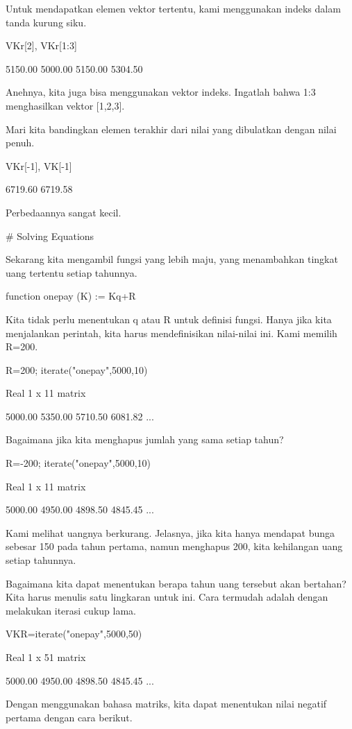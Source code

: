 \documentclass{article}
\begin{document}
Untuk mendapatkan elemen vektor tertentu, kami menggunakan indeks
dalam tanda kurung siku.


\>VKr[2], VKr[1:3]


        5150.00 
        5000.00     5150.00     5304.50 

Anehnya, kita juga bisa menggunakan vektor indeks. Ingatlah bahwa 1:3
menghasilkan vektor [1,2,3].


Mari kita bandingkan elemen terakhir dari nilai yang dibulatkan dengan
nilai penuh.


\>VKr[-1], VK[-1]


        6719.60 
        6719.58 

Perbedaannya sangat kecil.


# Solving Equations

Sekarang kita mengambil fungsi yang lebih maju, yang menambahkan
tingkat uang tertentu setiap tahunnya.


\>function onepay (K) := K\*q+R


Kita tidak perlu menentukan q atau R untuk definisi fungsi. Hanya jika
kita menjalankan perintah, kita harus mendefinisikan nilai-nilai ini.
Kami memilih R=200.


\>R=200; iterate("onepay",5000,10)


    Real 1 x 11 matrix
    
        5000.00     5350.00     5710.50     6081.82     ...

Bagaimana jika kita menghapus jumlah yang sama setiap tahun?


\>R=-200; iterate("onepay",5000,10)


    Real 1 x 11 matrix
    
        5000.00     4950.00     4898.50     4845.45     ...

Kami melihat uangnya berkurang. Jelasnya, jika kita hanya mendapat
bunga sebesar 150 pada tahun pertama, namun menghapus 200, kita
kehilangan uang setiap tahunnya.


Bagaimana kita dapat menentukan berapa tahun uang tersebut akan
bertahan? Kita harus menulis satu lingkaran untuk ini. Cara termudah
adalah dengan melakukan iterasi cukup lama.


\>VKR=iterate("onepay",5000,50)


    Real 1 x 51 matrix
    
        5000.00     4950.00     4898.50     4845.45     ...

Dengan menggunakan bahasa matriks, kita dapat menentukan nilai negatif
pertama dengan cara berikut.
\end{document}
